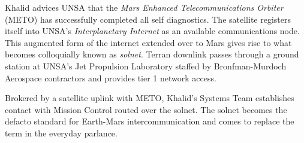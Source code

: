 Khalid advices UNSA that the {\it Mars Enhanced Telecommunications Orbiter} (METO) has successfully completed all self diagnostics. The satellite registers itself into UNSA's {\it Interplanetary Internet} as an available communications node. This augmented form of the internet extended over to Mars gives rise to what becomes colloquially known as {\it solnet}. Terran downlink passes through a ground station at UNSA's Jet Propulsion Laboratory staffed by Bronfman-Murdoch Aerospace contractors and provides tier 1 network access.

Brokered by a satellite uplink with METO, Khalid's Systems Team establishes contact with Mission Control routed over the solnet. The solnet becomes the defacto standard for Earth-Mars intercommunication and comes to replace the term  in the everyday parlance.
\StopTimelineDate


